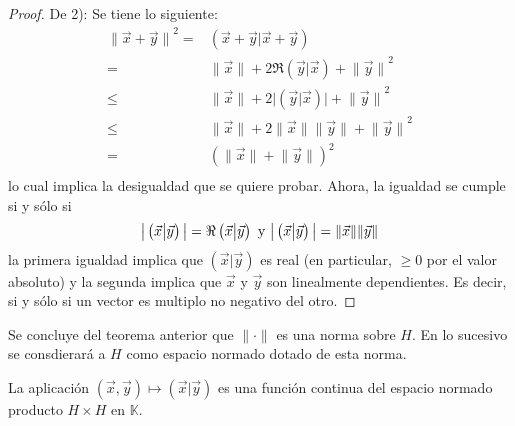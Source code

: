 \documentclass[12pt]{report}
\newcounter{it}
\theoremstyle{largebreak}
\newcommand\abs[1]{\ensuremath{\big|#1\big|}}
\newcommand\norm[1]{\ensuremath{\|#1\|}}
\newcommand\pint[2]{\ensuremath{\left(#1\big| #2\right)}}
\begin{document}
\begin{proof}
        De 2): Se tiene lo siguiente:
        \begin{equation*}
            \begin{split}
                \norm{\vec{x}+\vec{y}}^2=&\pint{\vec{x}+\vec{y}}{\vec{x}+\vec{y}}\\
                =&\norm{\vec{x}}+2\Re\pint{\vec{y}}{\vec{x}}+\norm{\vec{y}}^2\\
                \leq&\norm{\vec{x}}+2\abs{\pint{\vec{y}}{\vec{x}}}+\norm{\vec{y}}^2\\
                \leq &\norm{\vec{x}}+2\norm{\vec{x}}\norm{\vec{y}}+\norm{\vec{y}}^2\\
                =& (\norm{\vec{x}}+\norm{\vec{y}})^2\\
            \end{split}
        \end{equation*}
        lo cual implica la desigualdad que se quiere probar. Ahora, la igualdad se cumple si y sólo si
        \begin{equation*}
            \abs{\pint{\vec{x}}{\vec{y}}}=\Re\pint{\vec{x}}{\vec{y}}\textup{ y }\abs{\pint{\vec{x}}{\vec{y}}}=\norm{\vec{x}}\norm{\vec{y}}
        \end{equation*}
        la primera igualdad implica que $\pint{\vec{x}}{\vec{y}}$ es real (en particular, $\geq0$ por el valor absoluto) y la segunda implica que $\vec{x}$ y $\vec{y}$ son linealmente dependientes. Es decir, si y sólo si un vector es multiplo no negativo del otro.
    \end{proof}

    Se concluye del teorema anterior que $\norm{\cdot}$ es una norma sobre $H$. En lo sucesivo se consdierará a $H$ como espacio normado dotado de esta norma.

    \begin{propo}
        La aplicación $(\vec{x},\vec{y})\mapsto\pint{\vec{x}}{\vec{y}}$
        es una función continua del espacio normado producto $H\times H$ en $\mathbb{K}$.
    \end{propo}
\end{document}
